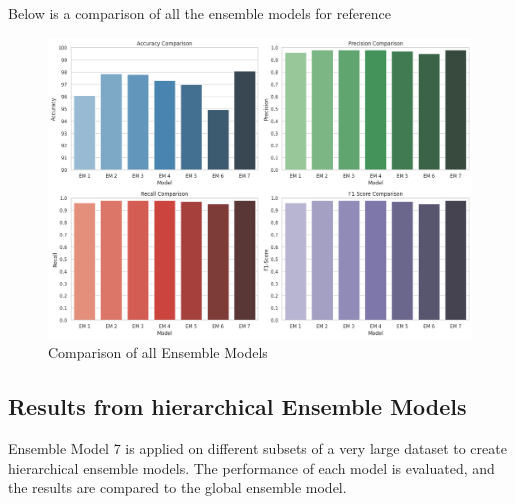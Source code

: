 \pagebreak

\noindent
Below is a comparison of all the ensemble models for reference

\begin{figure}[h!]  
    \centering
    \includegraphics[width=1.0\textwidth]{Images/EM COMPARE.png}  
    \caption{Comparison of all Ensemble Models}
    \label{lstm arch}  %
\end{figure}



\subsection{Results from hierarchical Ensemble Models}

\noindent
Ensemble Model 7 is applied on different subsets of a very large dataset to create hierarchical ensemble models. The performance of each model is evaluated, and the results are compared to the global ensemble model. 

